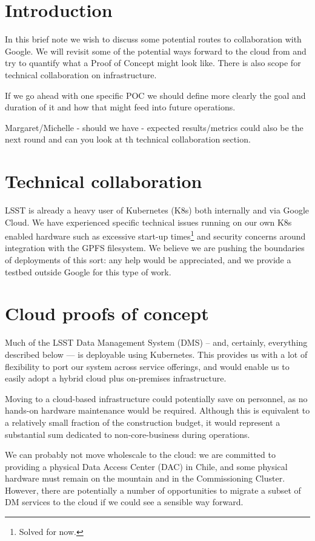 \section{Introduction}
In this brief note we wish to discuss some potential routes to collaboration with Google. We will revisit some of the potential ways forward to the cloud from  and try to quantify what a Proof of Concept might look like. There is also scope for technical collaboration on infrastructure.

If we go ahead with one specific POC we should define more clearly the goal and duration of it and how that might feed into future operations.

{\color{red} Margaret/Michelle - should we have - expected results/metrics could also be the next round and can you look at th technical collaboration section. }
\section{Technical collaboration}

LSST is already a heavy user of Kubernetes (K8s) both internally and via Google Cloud.
We have experienced specific technical issues running on our own K8s enabled hardware such as excessive start-up times\footnote{Solved for now.} and security concerns around integration with the GPFS filesystem.
We believe we are pushing the boundaries of deployments of this sort: any help would be appreciated, and we provide a testbed outside Google for this type of work.

\section{Cloud proofs of concept}\label{sect:pocs}

Much of the LSST Data Management System (DMS) – and, certainly, everything described below — is deployable using Kubernetes.
This provides us with a lot of flexibility to port our system across service offerings, and would enable us to easily adopt a hybrid cloud plus on-premises infrastructure.

Moving to a cloud-based infrastructure could potentially save on personnel, as no hands-on hardware maintenance would be required.
Although this is equivalent to a relatively small fraction of the construction budget, it would represent a substantial sum dedicated to non-core-business during operations.

We can probably not move wholescale to the cloud: we are committed to providing a physical Data Access Center (DAC) in Chile, and some physical hardware must remain on the mountain and in the Commissioning Cluster.
However, there are potentially a number of opportunities to migrate a subset of DM services to the cloud if we could see a sensible way forward.

